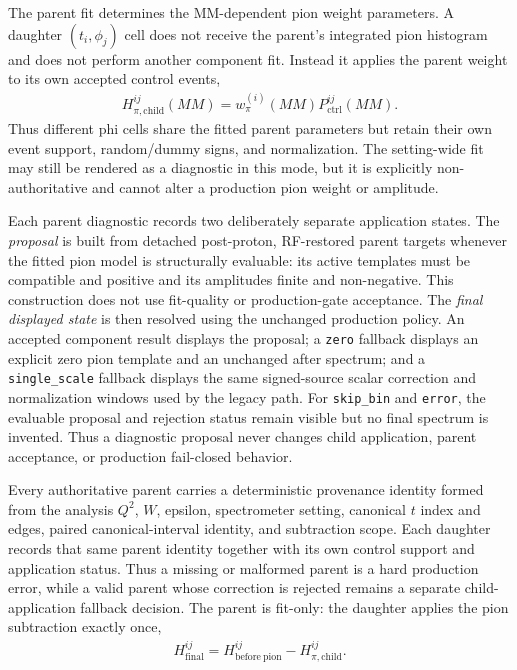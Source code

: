 \documentclass[11pt]{article}
\begin{document}
The parent fit determines the MM-dependent pion weight parameters.  A daughter
$(t_i,\phi_j)$ cell does not receive the parent's integrated pion histogram and
does not perform another component fit.  Instead it applies the parent weight
to its own accepted control events,
\begin{align}
  H_{\pi,\mathrm{child}}^{ij}(MM)
  =w_{\pi}^{(i)}(MM)P_{\mathrm{ctrl}}^{ij}(MM).
\end{align}
Thus different phi cells share the fitted parent parameters but retain their
own event support, random/dummy signs, and normalization.  The setting-wide
fit may still be rendered as a diagnostic in this mode, but it is explicitly
non-authoritative and cannot alter a production pion weight or amplitude.

Each parent diagnostic records two deliberately separate application states.
The \emph{proposal} is built from detached post-proton, RF-restored parent
targets whenever the fitted pion model is structurally evaluable: its active
templates must be compatible and positive and its amplitudes finite and
non-negative.  This construction does not use fit-quality or production-gate
acceptance.  The \emph{final displayed state} is then resolved using the
unchanged production policy.  An accepted component result displays the
proposal; a \texttt{zero} fallback displays an explicit zero pion template and
an unchanged after spectrum; and a \texttt{single_scale} fallback displays the
same signed-source scalar correction and normalization windows used by the
legacy path.  For \texttt{skip_bin} and \texttt{error}, the evaluable proposal
and rejection status remain visible but no final spectrum is invented.  Thus a
diagnostic proposal never changes child application, parent acceptance, or
production fail-closed behavior.

Every authoritative parent carries a deterministic provenance identity formed
from the analysis $Q^2$, $W$, epsilon, spectrometer setting, canonical $t$
index and edges, paired canonical-interval identity, and subtraction scope.
Each daughter records that same parent identity together with its own control
support and application status.  Thus a missing or malformed parent is a hard
production error, while a valid parent whose correction is rejected remains a
separate child-application fallback decision.  The parent is fit-only: the
daughter applies the pion subtraction exactly once,
\begin{align}
  H_{\mathrm{final}}^{ij}
  =H_{\mathrm{before\ pion}}^{ij}-H_{\pi,\mathrm{child}}^{ij}.
\end{align}
\end{document}
